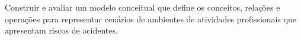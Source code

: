 Construir e avaliar um modelo conceitual que define os conceitos, relações e operações para representar cenários de ambientes de atividades profissionais que apresentam riscos de acidentes.